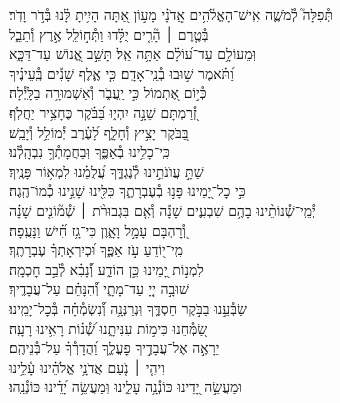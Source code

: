 \documentclass[twoside, openany, parskip=half, 11pt]{book}
\begin{document}
\begin{narrow}
תְּ֯פִלָּה֮ לְ֯מֹשֶׁ֢ה אִֽישׁ־הָאֱלֹ֫הִ֥ים \hfill \break
אֲֽדֹנָ֗י \hfill מָע֣וֹן אַ֭תָּה הָיִ֥יתָ לָּ֗נוּ בְּ֯דֹ֣ר וָדֹֽר׃ \\
בְּ֯טֶ֤רֶם ׀ הָ֘רִ֤ים יֻלָּ֗דוּ \hfill וַתְּ֯ח֣וֹלֵֽל אֶ֣רֶץ וְ֯תֵבֵ֑ל \\ וּֽמֵעוֹלָ֥ם עַד־ע֝וֹלָ֗ם אַתָּ֥ה אֵֽל׃ \hfill
תָּשֵׁ֣ב אֱ֭נוֹשׁ עַד־דַּכָּ֑א\\ וַ֝תֹּ֗אמֶר שׁ֣וּבוּ בְ֯נֵֽי־אָדָֽם׃ \hfill
כִּ֤י אֶ֪לֶף שָׁנִ֡ים בְּֽ֯עֵינֶ֗יךָ \\ כְּ֯י֣וֹם אֶ֭תְמוֹל כִּ֣י יַֽעֲבֹ֑ר \hfill וְ֯אַשְׁמוּרָ֥ה בַלָּֽיְ֯לָה׃ \\
זְ֭֯רַמְתָּם שֵׁנָ֣ה יִהְי֑וּ \hfill בַּ֝בֹּ֗קֶר כֶּחָצִ֥יר יַחֲלֹֽף׃ \\
בַּ֭בֹּקֶר יָצִ֣יץ וְ֯חָלָ֑ף \hfill לָ֝עֶ֗רֶב יְ֯מוֹלֵ֥ל וְ֯יָבֵֽשׁ׃ \\
כִּֽי־כָלִ֥ינוּ בְ֯אַפֶּ֑ךָ \hfill וּֽבַחֲמָתְ֯ךָ֥ נִבְהָֽלְ֯נוּ׃ \\
שַׁתָּ֣ עֲוֺנֹתֵ֣ינוּ לְ֯נֶגְדֶּ֑ךָ \hfill עֲ֝לֻמֵ֗נוּ לִמְא֥וֹר פָּנֶֽיךָ׃ \\
כִּ֣י כׇל־יָ֭מֵינוּ פָּנ֣וּ בְ֯עֶבְרָתֶ֑ךָ \hfill כִּלִּ֖ינוּ שָׁנֵ֣ינוּ כְ֯מוֹ־הֶֽגֶה׃ \\
יְ֯מֵֽי־שְׁ֯נוֹתֵ֨ינוּ בָהֶ֥ם שִׁבְעִ֪ים שָׁנָ֡ה \hfill וְ֯אִ֤ם בִּגְבוּרֹ֨ת ׀ שְׁ֯מ֘וֹנִ֤ים שָׁנָ֗ה\\ וְ֭֯רׇהְבָּם עָמָ֣ל וָאָ֑וֶן \hfill כִּי־גָ֥ז חִ֗֝ישׁ וַנָּעֻֽפָה׃ \\
מִֽי־י֭וֹדֵעַ עֹ֣ז אַפֶּ֑ךָ \hfill וּ֝כְיִרְאָתְךָ֗ עֶבְרָתֶֽךָ׃ \\
לִמְנ֣וֹת יָ֭מֵינוּ כֵּ֣ן הוֹדַ֑ע \hfill וְ֯֝נָבִ֗א לְ֯בַ֣ב חׇכְמָֽה׃ \\
שׁוּבָ֣ה יְיָ֭ עַד־מָתָ֑י \hfill וְ֯֝הִנָּחֵ֗ם עַל־עֲבָדֶֽיךָ׃ \\
שַׂבְּ֯עֵ֣נוּ בַבֹּ֣קֶר חַסְדֶּ֑ךָ \hfill וּֽנְרַנְּנָ֥ה וְ֯֝נִשְׂמְ֯חָ֗ה בְּ֯כׇל־יָמֵֽינוּ׃ \\
שַׂ֭מְּ֯חֵנוּ כִּימ֣וֹת עִנִּיתָ֑נוּ \hfill שְׁ֯֝נ֗וֹת רָאִ֥ינוּ רָעָֽה׃ \\
יֵרָאֶ֣ה אֶל־עֲבָדֶ֣יךָ פׇעֳלֶ֑ךָ \hfill וַ֝הֲדָרְ֯ךָ֗ עַל־בְּ֯נֵיהֶֽם׃ \\
וִיהִ֤י ׀ נֹ֤עַם אֲדֹנָ֥י אֱלֹהֵ֗ינוּ \hfill עָ֫לֵ֥ינוּ \\ וּמַעֲשֵׂ֣ה יָ֭דֵינוּ כּוֹנְ֯נָ֥ה עָלֵ֑ינוּ \hfill וּֽמַעֲשֵׂ֥ה יָ֝דֵ֗ינוּ כּוֹנְ֯נֵֽהוּ׃ \\



\end{narrow}
\end{document}
